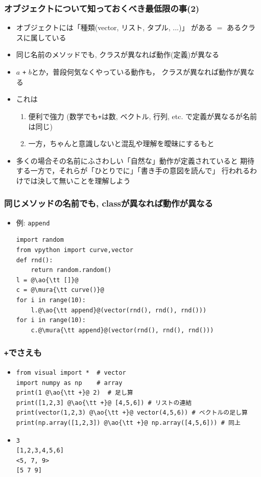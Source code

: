 \documentclass[10pt,dvipdfmx]{beamer}
\newcommand{\mura}[1]{{\color{purple}#1}}
\newcommand{\ao}[1]{{\color{blue}#1}}
\newcommand{\aka}[1]{{\color{red}#1}}
\begin{document}
\begin{frame}
\frametitle{オブジェクトについて知っておくべき最低限の事(2)}
\begin{itemize}
\item オブジェクトには「種類(vector, リスト, タプル, ...)」
がある $=$ ある\ao{クラス}に属している
\item \ao{同じ名前のメソッドでも, クラスが異なれば動作(定義)が異なる}
\item \ao{$a$ {\tt +} $b$とか，普段何気なくやっている動作も，}
  クラスが異なれば動作が異なる
\item これは
  \begin{enumerate}
  \item 便利で強力 (数学でも{\tt +}は数, ベクトル, 行列, etc.
    で定義が異なるが名前は同じ)
  \item 一方，ちゃんと意識しないと混乱や理解を曖昧にするもと
  \end{enumerate}
\item 多くの場合その名前にふさわしい「自然な」動作が定義されていると
期待する一方で，それらが\aka{「ひとりでに」「書き手の意図を読んで」
行われるわけでは決して無い}ことを理解しよう
\end{itemize}
\end{frame}

\begin{frame}[fragile]
\frametitle{同じメソッドの名前でも, classが異なれば動作が異なる}
\begin{itemize}
\item 例: {\tt append}
\begin{lstlisting}
import random
from vpython import curve,vector
def rnd():
    return random.random()
l = @\ao{\tt []}@
c = @\mura{\tt curve()}@
for i in range(10):
    l.@\ao{\tt append}@(vector(rnd(), rnd(), rnd()))
for i in range(10):
    c.@\mura{\tt append}@(vector(rnd(), rnd(), rnd()))
\end{lstlisting}
\end{itemize}
\end{frame}


\begin{frame}[fragile]
\frametitle{{\tt +}でさえも}
\begin{itemize}
\item<1-> []
\begin{lstlisting}
from visual import *  # vector
import numpy as np    # array
print(1 @\ao{\tt +}@ 2)  # 足し算
print([1,2,3] @\ao{\tt +}@ [4,5,6]) # リストの連結
print(vector(1,2,3) @\ao{\tt +}@ vector(4,5,6)) # ベクトルの足し算
print(np.array([1,2,3]) @\ao{\tt +}@ np.array([4,5,6])) # 同上
\end{lstlisting}

\item<2-> []
\begin{lstlisting}
3
[1,2,3,4,5,6]
<5, 7, 9>
[5 7 9]
\end{lstlisting}
\end{itemize}
\end{frame}
\end{document}
